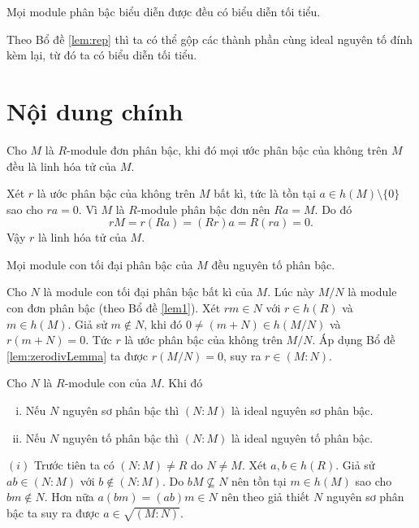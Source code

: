 \begin{proposition}
    Mọi module phân bậc biểu diễn được đều có biểu diễn tối tiểu. 
\end{proposition}
\startproof Theo Bổ đề \ref{lem:rep} thì ta có thể gộp các thành phần cùng ideal nguyên tố đính kèm lại, từ đó ta có biểu diễn tối tiểu.\QED

\section{Nội dung chính}
\begin{lemma}
    \label{lem:zerodivLemma}
    Cho $M$ là $R$-module đơn phân bậc, khi đó mọi ước phân bậc của không trên $M$ đều là linh hóa tử của $M$.
\end{lemma}
\startproof Xét $r$ là ước phân bậc của không trên $M$ bất kì, tức là tồn tại $a \in h(M)\setminus\{0\}$ sao cho $ra=0$. Vì $M$ là $R$-module phân bậc đơn nên $Ra = M$. Do đó
$$
    rM = r(Ra) = (Rr)a = R(ra) = 0.
$$
Vậy $r$ là linh hóa tử của $M$.\QED

\begin{proposition}
    Mọi module con tối đại phân bậc của $M$ đều nguyên tố phân bậc.
\end{proposition}
\startproof Cho $N$ là module con tối đại phân bậc bất kì của $M$. Lúc này $M/N$ là module con đơn phân bậc (theo Bổ đề \ref{lem1}). Xét $rm \in N$ với $r \in h(R)$ và $m \in h(M)$. Giả sử $m \notin N$, khi đó $0 \neq (m + N) \in h(M/N)$ và $r(m+N) = 0$. Tức $r$ là ước phân bậc của không trên $M/N$. Áp dụng Bổ đề \ref{lem:zerodivLemma} ta được $r(M/N) = 0$, suy ra $r \in (M:N)$. \QED

\begin{proposition}
    Cho $N$ là $R$-module con của $M$. Khi đó
    \begin{enumerate}[(i)]
        \item Nếu $N$ nguyên sơ phân bậc thì $(N:M)$ là ideal nguyên sơ phân bậc.
        \item Nếu $N$ nguyên tố phân bậc thì $(N:M)$ là ideal nguyên tố phân bậc.
    \end{enumerate}
\end{proposition}
\startproof $(i)$ Trước tiên ta có $(N:M) \neq R$ do $N \neq M$. Xét $a,b \in h(R)$. Giả sử $ab \in (N:M)$ với $b \notin (N:M)$. Do $bM \not\subseteq N$ nên tồn tại $m \in h(M)$ sao cho $bm \notin N$. Hơn nữa $a(bm) = (ab)m \in N$ nên theo giả thiết $N$ nguyên sơ phân bậc ta suy ra được $a \in \sqrt{(M:N)}$.\QED

